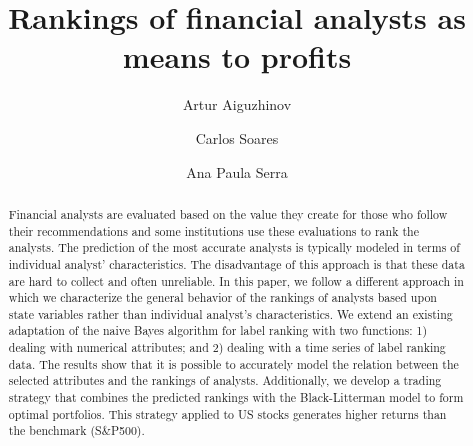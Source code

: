 \documentclass{llncs}\usepackage[]{graphicx}\usepackage[]{color}
\begin{document}
%

\title{Rankings of financial analysts as means to profits}
%
\author{Artur Aiguzhinov   \and Carlos Soares  \and Ana Paula Serra}


\maketitle

\begin{abstract}
Financial analysts are evaluated based on the value they create for those who follow their recommendations and some institutions use these evaluations to rank the analysts. The prediction of the most accurate analysts is  typically modeled in terms of individual analyst' characteristics. The disadvantage of this approach is that these data are hard to collect and often unreliable. In this paper, we follow a different approach in which we characterize the general behavior of the rankings of analysts based upon state variables rather than individual analyst's characteristics. We extend an existing adaptation of the naive Bayes algorithm for label ranking with two functions: 1) dealing with numerical attributes; and 2) dealing with a time series of label ranking data. The results show that it is possible to accurately model the relation between the selected attributes and the rankings of analysts. Additionally, we develop a trading strategy that combines the predicted rankings with the Black-Litterman model to form optimal portfolios. This strategy applied to  US stocks  generates higher returns than the benchmark (S\&P500).
\end{abstract}
\end{document}
